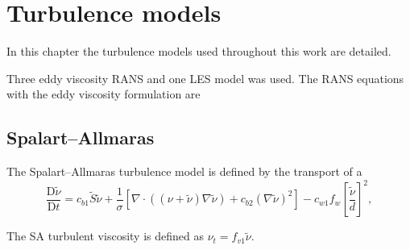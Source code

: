 \chapter{Turbulence models}
\doublespace

In this chapter the turbulence models used throughout this work are detailed.

Three eddy viscosity RANS and one LES model was used. The RANS equations with
the eddy viscosity formulation are



\section{Spalart--Allmaras}

The Spalart--Allmaras turbulence model is defined by the transport of a 
\begin{equation}
\frac{\mathrm{D} \tilde{\nu}}{\mathrm{D} t}
= c_{b1} \tilde{S} \tilde{\nu}
+ \frac{1}{\sigma} 
\left[ 
\nabla \cdot \left( (\nu + \tilde{\nu}) \nabla \tilde{\nu} \right)
+ c_{b2} (\nabla \tilde{\nu})^2
\right]
- c_{w1} f_w \left[ \frac{\tilde{\nu}}{d} \right]^2,
\label{eq:SA}
\end{equation}

The SA turbulent viscosity is defined as $\nu_t = f_{v1} \tilde{\nu}$.
